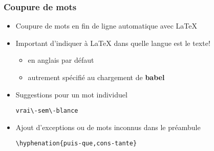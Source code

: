 \begin{frame}[fragile=singleslide]
  \frametitle{Coupure de mots}
  \begin{itemize}
  \item Coupure de mots en fin de ligne automatique avec \LaTeX
  \item Important d'indiquer à {\LaTeX} dans quelle langue est le texte!
    \begin{itemize}
    \item en anglais par défaut
    \item autrement spécifié au chargement de \textbf{babel}
    \end{itemize}
  \item Suggestions pour un mot individuel
\begin{lstlisting}
vrai\-sem\-blance
\end{lstlisting}
  \item Ajout d'exceptions ou de mots inconnus dans le préambule
\begin{lstlisting}
\hyphenation{puis-que,cons-tante}
\end{lstlisting}
  \end{itemize}
\end{frame}
